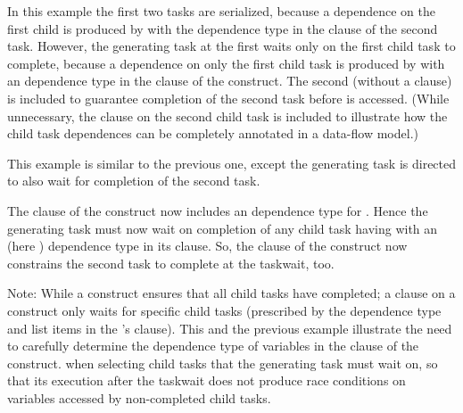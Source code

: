 

In this example the first two tasks are serialized, because a dependence on
the first child is produced by  with the  dependence type
in the  clause of the second task.
However, the generating task at the first  waits only on the
first child task to complete, because a dependence on only the first child task
is produced by  with an  dependence type in the
 clause of the  construct.
The second  (without a  clause) is included
to guarantee completion of the second task before  is accessed.
(While unnecessary, the  clause on the second child task is
included to illustrate how the child task dependences can be completely annotated
in a data-flow model.)



\clearpage


This example is similar to the previous one, except the generating task is
directed to also wait for completion of the second task.

The  clause of the  construct now includes an
 dependence type for .  Hence the generating task must now
wait on completion of any child task having  with an 
(here ) dependence type in its  clause.
So, the  clause of the  construct now constrains
the second task to complete at the taskwait, too.

Note: While a  construct ensures that all child tasks have completed; a  clause on a 
construct only waits for specific child tasks (prescribed by the dependence type and list
items in the 's  clause).
This and the previous example illustrate the need to carefully determine
the dependence type of variables in the  clause of the  construct.
when selecting child tasks that the generating task must wait on, so that its execution after the
taskwait does not produce race conditions on variables accessed by non-completed child tasks.



